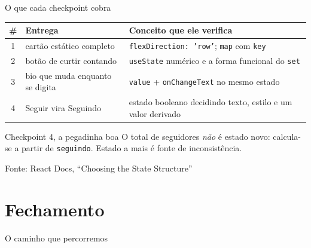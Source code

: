 \documentclass[aspectratio=169]{beamer}
\newcommand{\fonte}[1]{\vfill\hfill{\scriptsize\textcolor{UFSGray}{Fonte: #1}}}
\begin{document}
\begin{frame}{O que cada checkpoint cobra}
  \begin{center}
  \small
  \begin{tabular}{@{}clp{6.4cm}@{}}
    \toprule
    \textbf{\#} & \textbf{Entrega} & \textbf{Conceito que ele verifica} \\
    \midrule
    1 & cartão estático completo
      & \texttt{flexDirection: 'row'}; \texttt{map} com \texttt{key} \\
    2 & botão de curtir contando
      & \texttt{useState} numérico e a forma funcional do \texttt{set} \\
    3 & bio que muda enquanto se digita
      & \texttt{value} + \texttt{onChangeText} no mesmo estado \\
    4 & Seguir vira Seguindo
      & estado booleano decidindo texto, estilo e um valor derivado \\
    \bottomrule
  \end{tabular}
  \end{center}
  \begin{alertblock}{Checkpoint 4, a pegadinha boa}
    O total de seguidores \emph{não} é estado novo: calcula-se a partir de
    \texttt{seguindo}. Estado a mais é fonte de inconsistência.
  \end{alertblock}
  \fonte{React Docs, ``Choosing the State Structure''~\cite{react2025docs}}
\end{frame}

\section{Fechamento}

\begin{frame}{O caminho que percorremos}
  \begin{center}
  \end{center}
\end{frame}
\end{document}
